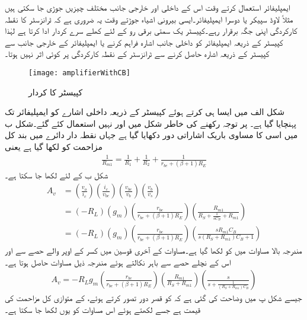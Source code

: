 ایمپلیفائر استعمال کرتے وقت اس کے داخلی اور خارجی جانب مختلف چیزیں جوڑی جا سکتی ہیں مثلاً لاوڈ سپیکر یا دوسرا ایمپلیفائر۔ایسی بیرونی اشیاء جوڑتے وقت یہ ضروری ہے کہ ٹرانزسٹر کا نقطہ کارکردگی اپنی جگہ برقرار رہے۔کپیسٹر یک سمتی برقی رو کے لئے کھلے سرے کردار ادا کرتا ہے لہٰذا کپیسٹر کے ذریعہ ایمپلیفائر کو داخلی جانب اشارہ فراہم کرنے یا ایمپلیفائر کے خارجی جانب سے کپیسٹر کے ذریعہ اشارہ حاصل کرنے سے ٹرانزسٹر کے نقطہ کارکردگی پر کوئی اثر نہیں ہوتا۔
\begin{figure}
\centering
\texttt{[image: amplifierWithCB]}
\caption{کپیسٹر  کا کردار}
\label{شکل_قابو_کپیسٹر_کا_کردار}
\end{figure}
شکل  الف میں ایسا ہی کرتے ہوئے کپیسٹر  کے ذریعہ داخلی اشارے کو ایمپلیفائر تک پہنچایا گیا ہے۔ پر توجہ رکھنے کی خاطر شکل میں  اور  نہیں استعمال کئے گئے۔شکل  ب میں اسی کا مساوی باریک اشاراتی دور دکھایا گیا ہے جہاں نقطہ دار دائرے میں بند کل مزاحمت کو  لکھا گیا ہے یعنی
\begin{align*}
\frac{1}{R_{m1}}=\frac{1}{R_1}+\frac{1}{R_2}+\frac{1}{r_{be}+\left(\beta+1 \right)R_E}
\end{align*}
شکل  ب کے لئے لکھا جا سکتا ہے۔
\begin{align*}
A_v&=\left( \frac{v_o}{i_c}\right ) \left( \frac{i_c}{v_{be}}\right ) \left( \frac{v_{be}}{v_b}\right ) \left( \frac{v_b}{v_s}\right )\\
&=\left(-R_L \right ) \left( g_m \right ) \left(\frac{r_{be}}{r_{be}+(\beta+1)R_E} \right ) \left(\frac{R_{m1}}{R_S+\frac{1}{s C_B}+R_{m1}} \right )\\
&=\left(-R_L \right ) \left(g_m \right ) \left(\frac{r_{be}}{r_{be}+(\beta+1)R_E} \right ) \left(\frac{s R_{m1} C_B}{s \left(R_S+R_{m1} \right ) C_B+1} \right )
\end{align*}
مندرجہ بالا مساوات میں  کو  لکھا گیا ہے۔مساوات کے آخری قوسین میں کسر کے اوپر والے حصے سے    اور اس کے نچلے حصے سے   باہر نکالتے ہوئے مندرجہ ذیل مساوات حاصل ہوتا ہے۔
\begin{align*}
A_v = -R_L  g_m  \left(\frac{r_{be}}{r_{be}+(\beta+1)R_E} \right ) \left (\frac{R_{m1}}{R_S+R_{m1}} \right ) \left(\frac{s}{s+\frac{1}{\left(R_S+R_{m1} \right )C_B}} \right )
\end{align*}
جیسے شکل  پ میں وضاحت کی گئی ہے کہ  کو قصر دور تصور کرتے ہوئے،  کے متوازی کل مزاحمت کی قیمت  ہے جسے   لکھتے ہوئے اس مساوات کو یوں لکھا جا سکتا ہے۔
